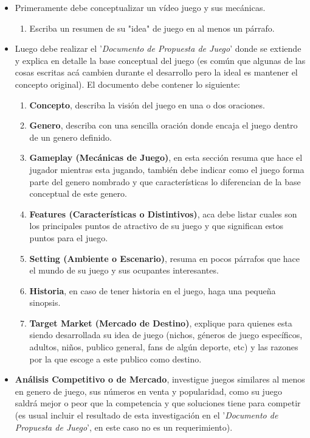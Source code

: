 \begin{itemize}
\item Primeramente debe conceptualizar un vídeo juego y sus mecánicas.
\begin{enumerate}
  \item Escriba un resumen de su "idea" de juego en al menos un párrafo.
\end{enumerate}
\item Luego debe realizar el '\emph{Documento de Propuesta de Juego}' donde se extiende y explica en detalle la base conceptual del juego (es común que algunas de las cosas escritas acá cambien durante el desarrollo pero la ideal es mantener el concepto original). El documento debe contener lo siguiente:
\begin{enumerate}
  \item \textbf{Concepto}, describa la visión del juego en una o dos oraciones.
  \item \textbf{Genero}, describa con una sencilla oración donde encaja el juego dentro de un genero definido.
  \item \textbf{Gameplay (Mecánicas de Juego)}, en esta sección resuma que hace el jugador mientras esta jugando, también debe indicar como el juego forma parte del genero nombrado y que características lo diferencian de la base conceptual de este genero.
  \item \textbf{Features (Características o Distintivos)}, aca debe listar cuales son los principales puntos de atractivo de su juego y que significan estos puntos para el juego.
  \item \textbf{Setting (Ambiente o Escenario)}, resuma en pocos párrafos que hace el mundo de su juego y sus ocupantes interesantes.
  \item \textbf{Historia}, en caso de tener historia en el juego, haga una pequeña sinopsis.
  \item \textbf{Target Market (Mercado de Destino)}, explique para quienes esta siendo desarrollada su idea de juego (nichos, géneros de juego específicos, adultos, niños, publico general, fans de algún deporte, etc) y las razones por la que escoge a este publico como destino.
\end{enumerate}
\item \textbf{Análisis Competitivo o de Mercado}, investigue juegos similares al menos en genero de juego, sus números en venta y popularidad, como su juego saldrá mejor o peor que la competencia y que soluciones tiene para competir (es usual incluir el resultado de esta investigación en el '\emph{Documento de Propuesta de Juego}', en este caso no es un requerimiento).
\end{itemize}